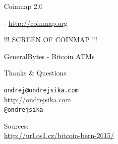 \documentclass{beamer}
\begin{document}
\begin{frame}

    {\LARGE Coinmap 2.0}\\

    \vspace{5mm}

    - \url{http://coinmap.org}

    !!! SCREEN OF COINMAP !!!  %

\end{frame}

\begin{frame}

    {\LARGE GeneralBytes - Bitcoin ATMs}\\

    \vspace{5mm}

\end{frame}

\begin{frame}

    {\LARGE Thanks \& Questions}\\

    \vspace{1cm}

    \texttt{ondrej@ondrejsika.com}\\
    \url{http://ondrejsika.com}\\
    \texttt{@ondrejsika}\\

    \vspace{1cm}

    Sources:\\
    \url{http://url.os1.cz/bitcoin-bern-2015/}
\end{frame}
\end{document}
